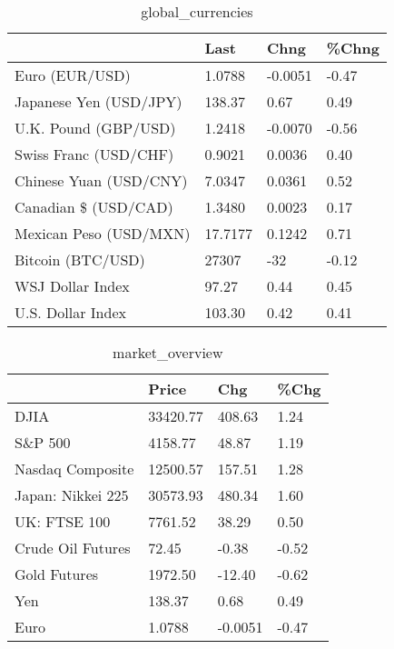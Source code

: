\documentclass{article}%
\begin{document}
%


\begin{table}[htbp]%
\caption{global\_currencies}%
\centering%
\begin{adjustbox}{width=1\textwidth}%
\begin{tabular}{llll}
\toprule
                       &    Last &    Chng & \%Chng \\
\midrule
        Euro (EUR/USD) &  1.0788 & -0.0051 & -0.47 \\
Japanese Yen (USD/JPY) &  138.37 &    0.67 &  0.49 \\
  U.K. Pound (GBP/USD) &  1.2418 & -0.0070 & -0.56 \\
 Swiss Franc (USD/CHF) &  0.9021 &  0.0036 &  0.40 \\
Chinese Yuan (USD/CNY) &  7.0347 &  0.0361 &  0.52 \\
  Canadian \$ (USD/CAD) &  1.3480 &  0.0023 &  0.17 \\
Mexican Peso (USD/MXN) & 17.7177 &  0.1242 &  0.71 \\
     Bitcoin (BTC/USD) &   27307 &     -32 & -0.12 \\
      WSJ Dollar Index &   97.27 &    0.44 &  0.45 \\
     U.S. Dollar Index &  103.30 &    0.42 &  0.41 \\
\bottomrule
\end{tabular}
%
\end{adjustbox}%
\end{table}

%


\begin{table}[htbp]%
\caption{market\_overview}%
\centering%
\begin{adjustbox}{width=1\textwidth}%
\begin{tabular}{llll}
\toprule
                  &    Price &     Chg &  \%Chg \\
\midrule
             DJIA & 33420.77 &  408.63 &  1.24 \\
          S\&P 500 &  4158.77 &   48.87 &  1.19 \\
 Nasdaq Composite & 12500.57 &  157.51 &  1.28 \\
Japan: Nikkei 225 & 30573.93 &  480.34 &  1.60 \\
     UK: FTSE 100 &  7761.52 &   38.29 &  0.50 \\
Crude Oil Futures &    72.45 &   -0.38 & -0.52 \\
     Gold Futures &  1972.50 &  -12.40 & -0.62 \\
              Yen &   138.37 &    0.68 &  0.49 \\
             Euro &   1.0788 & -0.0051 & -0.47 \\
\bottomrule
\end{tabular}
%
\end{adjustbox}%
\end{table}

%
\end{document}
